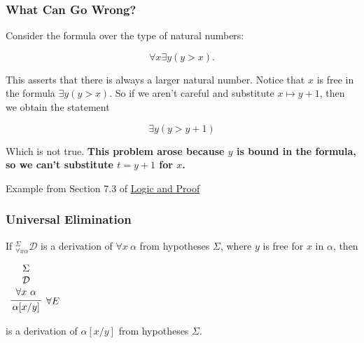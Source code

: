 \documentclass{beamer}
\theoremstyle{indentDefn} \newtheorem{defn}[]{Definition}
\begin{document}
\begin{frame}
	\frametitle{What Can Go Wrong?}
	
	Consider the formula over the type of natural numbers: 
	
	$$\forall x \exists y (y > x).$$
	
	This asserts that there is always a larger natural number. Notice that $x$ is free in the formula $\exists y (y > x)$. So if we aren't careful and substitute $x \mapsto y+1$, then we obtain the statement 
	
	$$ \exists y (y > y+1)$$
	
	Which is not true. {\bf This problem arose because $y$ is bound in the formula, so we can't substitute $t=y+1$ for $x$.}
	
	\footnotesize{Example from Section 7.3 of \href{https://leanprover.github.io/logic_and_proof_lean3/index.html}{Logic and Proof}}
	
\end{frame}



\begin{frame}
	\frametitle{Universal Elimination}
	
	If $^{\Sigma}_{\forall x \alpha}\mathcal{D}$ is a derivation of $\forall x \ \alpha$ from hypotheses $\Sigma$, where $y$ is free for $x$ in $\alpha$, then
	
	\vspace{0.5cm}
	
	\begin{center}
		$\begin{array}{c}
		\infer[\forall E]{\alpha[x/y]}{\begin{array}{c} 
			\Sigma \\
			\mathcal{D} \\ 
			\forall x \ \alpha			
			\end{array}}
		\end{array}$
	\end{center}
	
	is a derivation of $\alpha[x/y]$ from hypotheses $\Sigma$. 
	
\end{frame}
\end{document}
